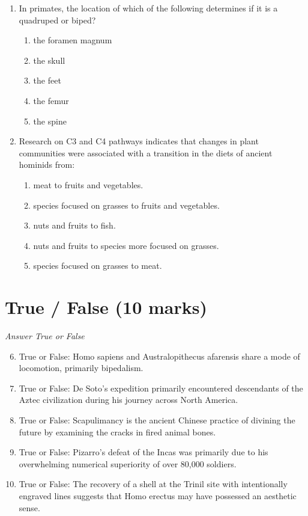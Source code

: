 \documentclass[12pt]{article}
\begin{document}
\begin{enumerate}[label=\arabic*.]
\begin{enumerate}[label=(\alph*)]
\end{enumerate}
\item In primates, the location of which of the following determines if it is a quadruped or
biped?
\begin{enumerate}[label=(\alph*)]
    \item the foramen magnum
    \item the skull
    \item the feet
    \item the femur
    \item the spine
\end{enumerate}
\item Research on C3 and C4 pathways indicates that changes in plant communities were associated
with a transition in the diets of ancient hominids from:
\begin{enumerate}[label=(\alph*)]
    \item meat to fruits and vegetables.
    \item species focused on grasses to fruits and vegetables.
    \item nuts and fruits to fish.
    \item nuts and fruits to species more focused on grasses.
    \item species focused on grasses to meat.
\end{enumerate}
\end{enumerate}

\section*{True / False (10 marks)}
\textit{Answer True or False}
\begin{enumerate}[label=\arabic*.]
\setcounter{enumi}{5}
\item True or False: Homo sapiens and Australopithecus afarensis share a mode of locomotion, primarily bipedalism.
\item True or False: De Soto's expedition primarily encountered descendants of the Aztec civilization during his journey across North America.
\item True or False: Scapulimancy is the ancient Chinese practice of divining the future by examining the cracks in fired animal bones.
\item True or False: Pizarro's defeat of the Incas was primarily due to his overwhelming numerical superiority of over 80,000 soldiers.
\item True or False: The recovery of a shell at the Trinil site with intentionally engraved lines suggests that Homo erectus may have possessed an aesthetic sense.
\end{enumerate}
\end{document}
